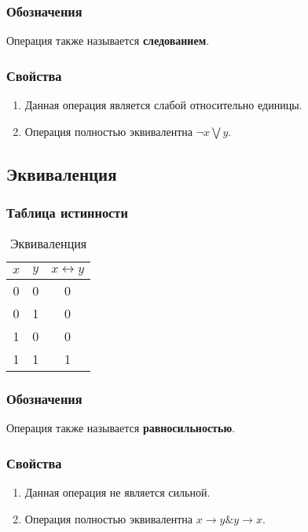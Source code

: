 \subsubsection{Обозначения}
Операция также называется \textbf{следованием}.

\subsubsection{Свойства}
\begin{enumerate}
	\item Данная операция является слабой относительно единицы.
	\item Операция полностью эквивалентна $\neg x \bigvee y$.
\end{enumerate}
\subsection{Эквиваленция}
\subsubsection{Таблица истинности}
\begin{table}[h]
	\begin{center}
		\begin{tabular}{|c|c|c|}
			\hline
			$x$ & $y$ & $x\leftrightarrow y$\\
			\hline
			0 & 0 & 0\\
			\hline
			0 & 1 & 0\\
			\hline
			1 & 0 & 0\\
			\hline
			1 & 1 & 1\\
			\hline
		\end{tabular}
		\caption{Эквиваленция}
	\end{center}
\end{table}

\subsubsection{Обозначения}
Операция также называется \textbf{равносильностью}.

\subsubsection{Свойства}
\begin{enumerate}
	\item Данная операция не является сильной.
	\item Операция полностью эквивалентна $x \rightarrow y \& y \rightarrow x$.
\end{enumerate}

